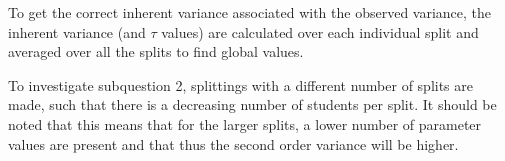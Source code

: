 \documentclass{scrartcl}
\begin{document}
To get the correct inherent variance associated with the observed variance, the inherent variance (and $\tau$ values) are calculated over each individual split and averaged over all the splits to find global values.

To investigate subquestion 2, splittings with a different number of splits are made, such that there is a decreasing number of students per split. It should be noted that this means that for the larger splits, a lower number of parameter values are present and that thus the second order variance will be higher.

\end{document}
